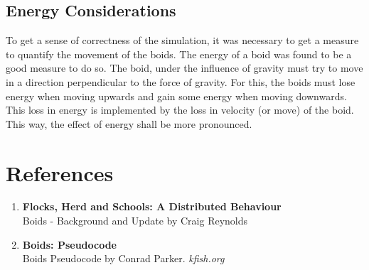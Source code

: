 \documentclass[12pt]{report}
\begin{document}
\subsection*{Energy Considerations}
To get a sense of correctness of the simulation, it was necessary to get a measure to quantify the movement of the boids. The energy of a boid was found to be a good measure to do so. The boid, under the influence of gravity must try to move in a direction perpendicular to the force of gravity. 
\newline
For this, the boids must lose energy when moving upwards and gain some energy when moving downwards. This loss in energy is implemented by the loss in velocity (or move) of the boid. This way, the effect of energy shall be more pronounced.

\newpage
\section*{References}
\begin{enumerate}
\item  \textbf{Flocks, Herd and Schools: A Distributed Behaviour} \\
Boids - Background and Update by Craig Reynolds

\item  \textbf{Boids: Pseudocode} \\
Boids Pseudocode by Conrad Parker. \emph{kfish.org}
\end{enumerate}
\end{document}
